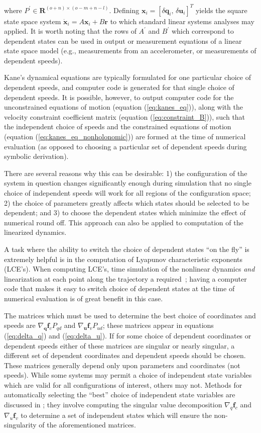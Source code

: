 \documentclass[smallcondensed,final]{svjour3}                     %
\begin{document}
where $P^\prime \in \bm{R}^{(o + n) \times (o - m + n - l)}$.  Defining
$\bm{x}_i = \left[\delta\bm{q}_i,\,\delta\bm{u}_i\right]^{T}$ yields the square
state space system $\dot{\bm{x}}_i = A \bm{x}_i + B \bm{r}$ to which standard
linear systems analyses may applied.  It is worth noting that the rows of
$A^\prime$ and $B^\prime$ which correspond to dependent states can be used in
output or measurement equations of a linear state space model (e.g.,
measurements from an accelerometer, or measurements of dependent speeds).

Kane's dynamical equations are typically formulated for one particular choice
of dependent speeds, and computer code is generated for that single choice of
dependent speeds. It is possible, however, to output computer code for the
unconstrained equations of motion (equation (\ref{eq:kanes_eq})), along with
the velocity constraint coefficient matrix (equation (\ref{eq:constraint_B})),
such that the independent choice of speeds and the constrained equations of
motion (equation (\ref{eq:kanes_eq_nonholonomic})) are formed at the time of
numerical evaluation (as opposed to choosing a particular set of dependent
speeds during symbolic derivation).

There are several reasons why this can be desirable: 1) the configuration of
the system in question changes significantly enough during simulation that no
single choice of independent speeds will work for all regions of the
configuration space; 2) the choice of parameters greatly affects which states
should be selected to be dependent; and 3) to choose the dependent states which
minimize the effect of numerical round off. This approach can also be applied
to computation of the linearized dynamics.

A task where the ability to switch the choice of dependent states ``on the
fly'' is extremely helpful is in the computation of Lyapunov characteristic
exponents (LCE's). When computing LCE's, time simulation of the nonlinear
dynamics \textit{and} linearization at each point along the trajectory a
required~\cite{Benettin1980a,Benettin1980b,Udwadia2001}; having a computer code
that makes it easy to switch choice of dependent states at the time of
numerical evaluation is of great benefit in this case.

The matrices which must be used to determine the best choice of coordinates and
speeds are $\nabla_{\bm{q}} \bm{f}_c P_{qd}$ and $\nabla_{\bm{u}} \bm{f}_v
P_{ud}$; these matrices appear in equations (\ref{eq:delta_q}) and
(\ref{eq:delta_u}).  If for some choice of dependent coordinates or dependent
speeds either of these matrices are singular or nearly singular, a different
set of dependent coordinates and dependent speeds should be chosen. These
matrices generally depend only upon parameters and coordinates (not speeds).
While some systems may permit a choice of independent state variables which are
valid for all configurations of interest, others may not. Methods for
automatically selecting the ``best'' choice of independent state variables are
discussed in \cite{Reckdahl1996}; they involve computing the singular value
decomposition $\nabla_q \bm{f}_c$ and $\nabla_u \bm{f}_v$  to determine a set
of independent states which will ensure the non-singularity of the
aforementioned matrices.
\end{document}
